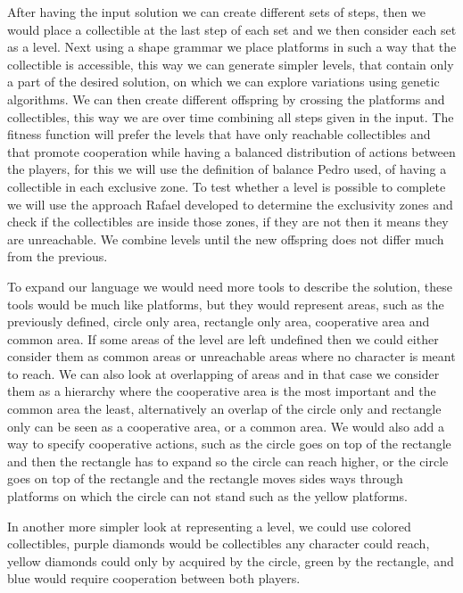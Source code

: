 \documentclass[runningheads]{llncs}
\begin{document}
After having the input solution we can create different sets of steps, then we would place a collectible at the last step of each set and we then consider each set as a level. Next using a shape grammar we place platforms in such a way that the collectible is accessible, this way we can generate simpler levels, that contain only a part of the desired solution, on which we can explore variations using genetic algorithms. We can then create different offspring by crossing the platforms and collectibles, this way we are over time combining all steps given in the input. The fitness function will prefer the levels that have only reachable collectibles and that promote cooperation while having a balanced distribution of actions between the players, for this we will use the definition of balance Pedro used, of having a collectible in each exclusive zone. To test whether a level is possible to complete we will use the approach Rafael developed to determine the exclusivity zones and check if the collectibles are inside those zones, if they are not then it means they are unreachable. We combine levels until the new offspring does not differ much from the previous.

To expand our language we would need more tools to describe the solution, these tools would be much like platforms, but they would represent areas, such as the previously defined, circle only area, rectangle only area, cooperative area and common area. If some areas of the level are left undefined then we could either consider them as common areas or unreachable areas where no character is meant to reach. We can also look at overlapping of areas and in that case we consider them as a hierarchy where the cooperative area is the most important and the common area the least, alternatively an overlap of the circle only and rectangle only can be seen as a cooperative area, or a common area. We would also add a way to specify cooperative actions, such as the circle goes on top of the rectangle and then the rectangle has to expand so the circle can reach higher, or the circle goes on top of the rectangle and the rectangle moves sides ways through platforms on which the circle can not stand such as the yellow platforms.

In another more simpler look at representing a level, we could use colored collectibles, purple diamonds would be collectibles any character could reach, yellow diamonds could only by acquired by the circle, green by the rectangle, and blue would require cooperation between both players.
\end{document}
